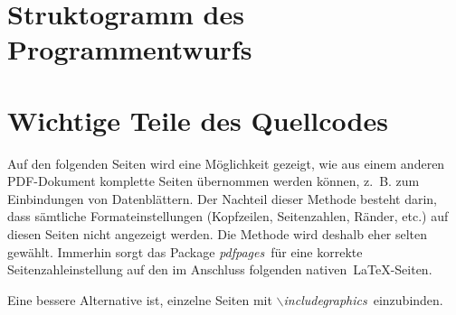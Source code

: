 \documentclass{scrbook} %
\begin{document}
\section{Struktogramm des Programmentwurfs}

\section{Wichtige Teile des Quellcodes}

\setcounter{chapter}{5}
\setcounter{section}{0}
\setcounter{table}{0}
\setcounter{figure}{0}


Auf den folgenden Seiten wird eine Möglichkeit gezeigt, wie aus einem anderen PDF-Dokument komplette Seiten übernommen werden können, z.~B. zum Einbindungen von Datenblättern. Der Nachteil dieser Methode besteht darin, dass sämtliche Formateinstellungen (Kopfzeilen, Seitenzahlen, Ränder, etc.) auf diesen Seiten nicht angezeigt werden. Die Methode wird deshalb eher selten gewählt. Immerhin sorgt das Package \textit{\glqq pdfpages\grqq}~für eine korrekte Seitenzahleinstellung auf den im Anschluss folgenden \glqq nativen\grqq~\LaTeX-Seiten.

Eine bessere Alternative ist, einzelne Seiten mit \textit{\glqq$\backslash$includegraphics\grqq}~einzubinden.


\end{document}
